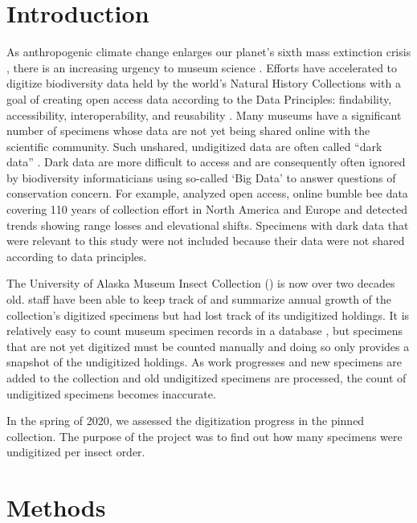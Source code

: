 \begin{multicols}{2}

\section{Introduction} 

As anthropogenic climate change enlarges our planet’s sixth mass extinction crisis \citep{Ceballosetal2015}, there is an increasing urgency to museum science \citep{RavenMiller2020}. Efforts have accelerated to digitize biodiversity data held by the world’s Natural History Collections with a goal of creating open access data according to the  Data Principles: findability, accessibility, interoperability, and reusability \citep{NelsonShari2019, Heberlingetal2021}. Many museums have a significant number of specimens whose data are not yet being shared online with the scientific community. Such unshared, undigitized data are often called “dark data” \citep{Heidorn2008, Sikesetal2016}. Dark data are more difficult to access and are consequently often ignored by biodiversity informaticians using so-called ‘Big Data’ to answer questions of conservation concern. For example, \citet{Kerretal2015} analyzed open access, online bumble bee data covering 110 years of collection effort in North America and Europe and detected trends showing range losses and elevational shifts. Specimens with dark data that were relevant to this study were not included because their data were not shared according to  data principles.

The University of Alaska Museum Insect Collection () is now over two decades old.  staff have been able to keep track of and summarize annual growth of the collection’s digitized specimens but had lost track of its undigitized holdings. It is relatively easy to count museum specimen records in a database \citep{Sikes2015, Whitmoreetal2020}, but specimens that are not yet digitized must be counted manually and doing so only provides a snapshot of the undigitized holdings. As work progresses and new specimens are added to the collection and old undigitized specimens are processed, the count of undigitized specimens becomes inaccurate.

In the spring of 2020, we assessed the digitization progress in the  pinned collection. The purpose of the project was to find out how many specimens were undigitized per insect order.

\section{Methods}


\end{multicols}
